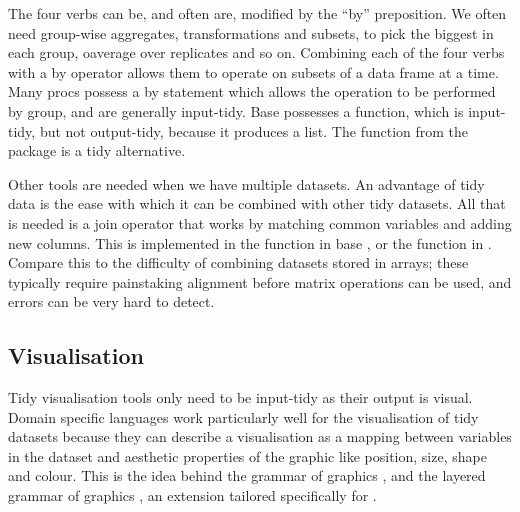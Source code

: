 \documentclass[article]{jss}
\begin{document}
The four verbs can be, and often are, modified by the ``by'' preposition. We often need group-wise aggregates, transformations and subsets, to pick the biggest in each group, oaverage over replicates and so on. Combining each of the four verbs with a by operator allows them to operate on subsets of a data frame at a time. Many  {\sc proc}s possess a {\sc by} statement which allows the operation to be performed by group, and are generally input-tidy. Base  possesses a  function, which is input-tidy, but not output-tidy, because it produces a list. The  function from the  package is a tidy alternative.


Other tools are needed when we have multiple datasets. An advantage of tidy data is the ease with which it can be combined with other tidy datasets. All that is needed is a join operator that works by matching common variables and adding new columns. This is implemented in the  function in base , or the  function in . Compare this to the difficulty of combining datasets stored in arrays; these typically require painstaking alignment before matrix operations can be used, and errors can be very hard to detect.

\subsection{Visualisation}

Tidy visualisation tools only need to be input-tidy as their output is visual. Domain specific languages work particularly well for the visualisation of tidy datasets because they can describe a visualisation as a mapping between variables in the dataset and aesthetic properties of the graphic like position, size, shape and colour. This is the idea behind the grammar of graphics \citep{wilkinson:2006}, and the layered grammar of graphics \citep{wickham:2007d}, an extension tailored specifically for .
\end{document}
